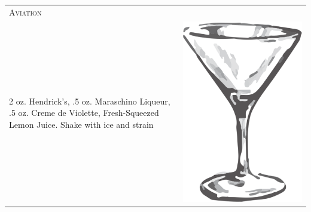 \documentclass{article}
\begin{document}
\begin{multicols}{2}
\begin{tabular}{p{2in} p{0.5in}}
\multicolumn{2}{p{3in}}{\centering\Huge\textsc{Aviation}}\\ 
  \vspace{-0.1in} 2 oz. Hendrick's, .5 oz. Maraschino Liqueur, .5 oz. Creme de Violette, Fresh-Squeezed Lemon Juice. Shake with ice and strain &
  \vspace{-0.1in} \includegraphics{goblet.png}
\end{tabular}


\end{multicols}
\end{document}
